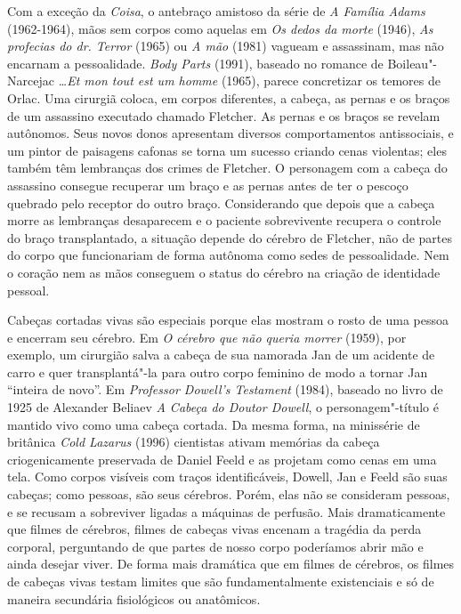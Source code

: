 Com a exceção da \emph{Coisa}, o antebraço amistoso da série de 
\emph{A Família Adams} (1962-1964), mãos sem corpos como aquelas em
\emph{Os dedos da morte} (1946), \emph{As profecias do dr. Terror}
(1965) ou \emph{A mão} (1981) vagueam e assassinam, mas não encarnam a
pessoalidade. \emph{Body Parts} (1991), baseado no romance de
Boileau"-Narcejac \emph{\ldots{}Et mon tout est um homme} (1965), parece
concretizar os temores de Orlac. Uma cirurgiã coloca, em corpos
diferentes, a cabeça, as pernas e os braços de um assassino executado
chamado Fletcher. As pernas e os braços se revelam autônomos. Seus novos
donos apresentam diversos comportamentos antissociais, e um pintor de
paisagens cafonas se torna um sucesso criando cenas violentas; eles
também têm lembranças dos crimes de Fletcher. O personagem com a cabeça
do assassino consegue recuperar um braço e as pernas antes de ter o
pescoço quebrado pelo receptor do outro braço. Considerando que depois
que a cabeça morre as lembranças desaparecem e o paciente sobrevivente
recupera o controle do braço transplantado, a situação depende do
cérebro de Fletcher, não de partes do corpo que funcionariam de forma
autônoma como sedes de pessoalidade. Nem o coração nem as mãos conseguem
o status do cérebro na criação de identidade pessoal.

Cabeças cortadas vivas são especiais porque elas mostram o rosto de uma
pessoa e encerram seu cérebro. Em \emph{O cérebro que não queria morrer}
(1959), por exemplo, um cirurgião salva a cabeça de sua namorada Jan de
um acidente de carro e quer transplantá"-la para outro corpo feminino de
modo a tornar Jan ``inteira de novo''. Em \emph{Professor Dowell's
Testament} (1984), baseado no livro de 1925 de Alexander Beliaev \emph{A
Cabeça do Doutor Dowell}, o personagem"-título é mantido vivo como uma
cabeça cortada. Da mesma forma, na minissérie de  britânica \emph{Cold
Lazarus} (1996) cientistas ativam memórias da cabeça criogenicamente
preservada de Daniel Feeld e as projetam como cenas em uma tela. Como
corpos visíveis com traços identificáveis, Dowell, Jan e Feeld são suas
cabeças; como pessoas, são seus cérebros. Porém, elas não se consideram
pessoas, e se recusam a sobreviver ligadas a máquinas de perfusão. Mais
dramaticamente que filmes de cérebros, filmes de cabeças vivas encenam a
tragédia da perda corporal, perguntando de que partes de nosso corpo
poderíamos abrir mão e ainda desejar viver. De forma mais dramática que
em filmes de cérebros, os filmes de cabeças vivas testam limites que são
fundamentalmente existenciais e só de maneira secundária fisiológicos ou
anatômicos.

